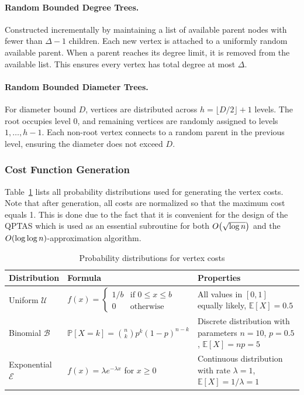 \paragraph{Random Bounded Degree Trees.} Constructed incrementally by maintaining a list of available parent nodes with fewer than $\Delta-1$ children. Each new vertex is attached to a uniformly random available parent. When a parent reaches its degree limit, it is removed from the available list. This ensures every vertex has total degree at most $\Delta$.

\paragraph{Random Bounded Diameter Trees.} For diameter bound $D$, vertices are distributed across $h = \lfloor D/2 \rfloor + 1$ levels. The root occupies level 0, and remaining vertices are randomly assigned to levels $1, \ldots, h-1$. Each non-root vertex connects to a random parent in the previous level, ensuring the diameter does not exceed $D$.

\subsubsection*{Cost Function Generation}

Table~\ref{tab:distributions} lists all probability distributions used for generating the vertex costs. Note that after generation, all costs are normalized so that the maximum cost equals 1. This is done due to the fact that it is convenient for the design of the QPTAS which is used as an essential subroutine for both $O\mathopen{}\left( \sqrt{\log n} \right)$ and the $O\mathopen{}\left( \log\log n \right)$-approximation algorithm. 

\begin{table}[!h]
\centering
\caption{Probability distributions for vertex costs}
\label{tab:distributions}
\begin{tabular}{|l|l|p{6.5cm}|}
\hline
\textbf{Distribution} & \textbf{Formula} & \textbf{Properties} \\
\hline
Uniform $\mathcal{U}$ & $f(x) = \begin{cases} 1/b & \text{if } 0 \leq x \leq b \\ 0 & \text{otherwise} \end{cases}$ & All values in $[0,1]$ equally likely, $\mathbb{E}[X]=0.5$ \\
\hline
Binomial $\mathcal{B}$ & $\mathbb{P}[X=k] = \binom{n}{k}p^k{(1-p)}^{n-k}$ & Discrete distribution with parameters $n=10$, $p=0.5$, $\mathbb{E}[X]=np=5$ \\
\hline
Exponential $\mathcal{E}$ & $f(x) = \lambda e^{-\lambda x}$ for $x \geq 0$ & Continuous distribution with rate $\lambda=1$, $\mathbb{E}[X]=1/\lambda=1$ \\
\hline
\end{tabular}
\end{table}

